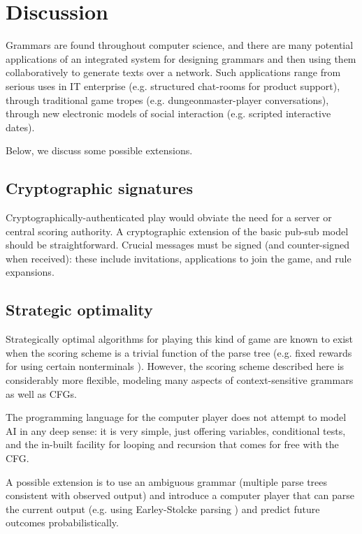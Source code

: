 \documentclass{acm_proc_article-sp}
\begin{document}
\section{Discussion}

Grammars are found throughout computer science,
and there are many potential applications of an
integrated system for designing grammars and then using them collaboratively to generate texts over a network.
Such applications range from
serious uses in IT enterprise (e.g. structured chat-rooms for product support),
through traditional game tropes (e.g. dungeonmaster-player conversations),
through new electronic models of social interaction (e.g. scripted interactive dates).

Below, we discuss some possible extensions.

\subsection{Cryptographic signatures}

Cryptographically-authenticated play would obviate the need for a server or central scoring authority.
A cryptographic extension of the basic pub-sub model should be straightforward.
Crucial messages must be signed (and counter-signed when received):
these include invitations, applications to join the game, and rule expansions.

\subsection{Strategic optimality}

Strategically optimal algorithms for playing this kind of game are known to exist when the scoring scheme is a trivial function of the parse tree (e.g. fixed rewards for using certain nonterminals \cite{DBLP:conf/icalp/EtessamiWY08}).
However, the scoring scheme described here is considerably more flexible, modeling many aspects of context-sensitive grammars as well as CFGs.

The programming language for the computer player does not attempt to model AI in any deep sense:
it is very simple, just offering variables, conditional tests, and the in-built facility for looping and recursion that comes for free with the CFG.

A possible extension is to use an ambiguous grammar (multiple parse trees consistent with observed output)
and introduce a computer player that can parse the current output
(e.g. using Earley-Stolcke parsing \cite{Stolcke:1995:EPC:211190.211197})
and predict future outcomes probabilistically.
\end{document}
